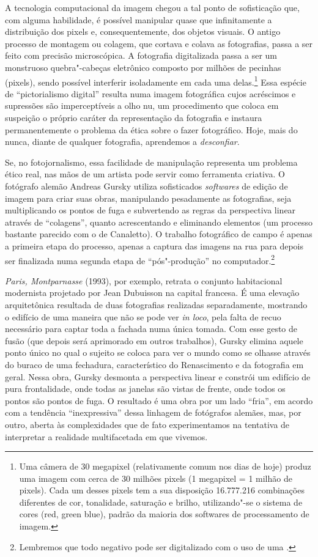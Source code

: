 A tecnologia computacional da imagem chegou a tal ponto de sofisticação
que, com alguma habilidade, é possível manipular quase que infinitamente
a distribuição dos pixels e, consequentemente, dos objetos visuais. O
antigo processo de montagem ou colagem, que cortava e colava as
fotografias, passa a ser feito com precisão microscópica. A fotografia
digitalizada passa a ser um monstruoso quebra"-cabeças eletrônico
composto por milhões de pecinhas (pixels), sendo possível interferir
isoladamente em cada uma delas.\footnote{Uma câmera de 30 megapixel
  (relativamente comum nos dias de hoje) produz uma imagem com cerca de
  30 milhões pixels (1 megapixel = 1 milhão de pixels). Cada um desses
  pixels tem a sua disposição 16.777.216 combinações diferentes de cor,
  tonalidade, saturação e brilho, utilizando"-se o sistema de cores 
  (red, green blue), padrão da maioria dos softwares de processamento de
  imagem.} Essa espécie de ``pictorialismo digital'' resulta numa imagem
fotográfica cujos acréscimos e supressões são imperceptíveis a olho nu,
um procedimento que coloca em suspeição o próprio caráter da
representação da fotografia e instaura permanentemente o problema da
ética sobre o fazer fotográfico. Hoje, mais do nunca, diante de qualquer
fotografia, aprendemos a \emph{desconfiar}.

Se, no fotojornalismo, essa facilidade de manipulação representa um
problema ético real, nas mãos de um artista pode servir como ferramenta
criativa. O fotógrafo alemão Andreas Gursky utiliza sofisticados
\emph{softwares} de edição de imagem para criar suas obras, manipulando
pesadamente as fotografias, seja multiplicando os pontos de fuga e
subvertendo as regras da perspectiva linear através de ``colagens'',
quanto acrescentando e eliminando elementos (um processo bastante
parecido com o de Canaletto). O trabalho fotográfico de campo é apenas a
primeira etapa do processo, apenas a captura das imagens na rua para
depois ser finalizada numa segunda etapa de ``pós"-produção'' no
computador.\footnote{Lembremos que todo negativo pode ser digitalizado
  com o uso de uma {}.}

\emph{Paris, Montparnasse} (1993), por exemplo, retrata o conjunto
habitacional modernista projetado por Jean Dubuisson na capital
francesa. É uma elevação arquitetônica resultada de duas fotografias
realizadas separadamente, mostrando o edifício de uma maneira que não se
pode ver \emph{in loco}, pela falta de recuo necessário para captar toda
a fachada numa única tomada. Com esse gesto de fusão (que depois será
aprimorado em outros trabalhos), Gursky elimina aquele ponto único no
qual o sujeito se coloca para ver o mundo como se olhasse através do
buraco de uma fechadura, característico do Renascimento e da fotografia
em geral. Nessa obra, Gursky desmonta a perspectiva linear e constrói um
edifício de pura frontalidade, onde todas as janelas são vistas de
frente, onde todos os pontos são pontos de fuga. O resultado é uma obra
por um lado ``fria'', em acordo com a tendência ``inexpressiva'' dessa
linhagem de fotógrafos alemães, mas, por outro, aberta às complexidades
que de fato experimentamos na tentativa de interpretar a realidade
multifacetada em que vivemos.

